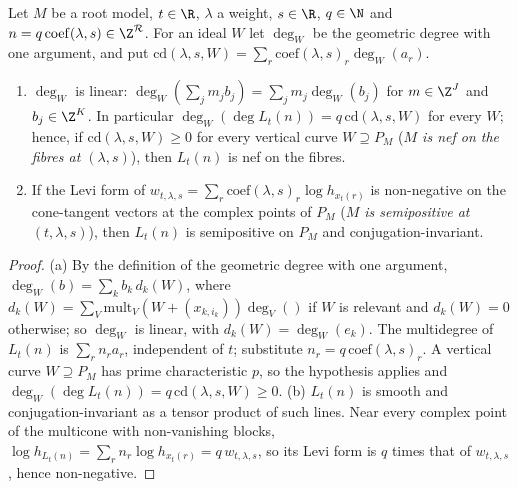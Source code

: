 \begin{lemma}\label{lem:pf:deepstr:nefcomb}
Let $M$ be a root model, $t\in\R$, $\lambda$ a weight, $s\in\R$, $q\in\N$ and $n=q\,\mathrm{coef}(\lambda,s)\in\Z^{\mathcal R}$. For an
ideal $W$ let $\deg_W$ be the geometric degree with one argument, and put
$\mathrm{cd}(\lambda,s,W)=\sum_r\mathrm{coef}(\lambda,s)_r\deg_W(a_r)$.
\begin{enumerate}[label=(\alph*)]
\item $\deg_W$ is linear: $\deg_W(\sum_jm_jb_j)=\sum_jm_j\deg_W(b_j)$ for $m\in\Z^J$ and $b_j\in\Z^K$. In particular
$\deg_W(\deg L_t(n))=q\,\mathrm{cd}(\lambda,s,W)$ for every $W$; hence, if $\mathrm{cd}(\lambda,s,W)\ge0$ for every vertical curve
$W\supseteq P_M$ (\emph{$M$ is nef on the fibres at $(\lambda,s)$}), then $L_t(n)$ is nef on the fibres.
\item If the Levi form of $w_{t,\lambda,s}=\sum_r\mathrm{coef}(\lambda,s)_r\log h_{x_t(r)}$ is non-negative on the cone-tangent
vectors at the complex points of $P_M$ (\emph{$M$ is semipositive at $(t,\lambda,s)$}), then $L_t(n)$ is semipositive
on $P_M$ and conjugation-invariant.
\end{enumerate}
\end{lemma}

\begin{proof}
(a) By the definition of the geometric degree with one argument, $\deg_W(b)=\sum_kb_k\,d_k(W)$, where
$d_k(W)=\sum_V\mathrm{mult}_V(W+(x_{k,i_k}))\deg_V()$ if $W$ is relevant and $d_k(W)=0$ otherwise; so $\deg_W$ is linear,
with $d_k(W)=\deg_W(e_k)$. The multidegree of $L_t(n)$ is $\sum_rn_ra_r$, independent of $t$; substitute
$n_r=q\,\mathrm{coef}(\lambda,s)_r$. A vertical curve $W\supseteq P_M$ has prime characteristic $p$, so the hypothesis applies
and $\deg_W(\deg L_t(n))=q\,\mathrm{cd}(\lambda,s,W)\ge0$. (b) $L_t(n)$ is smooth and conjugation-invariant as a
tensor product of such lines. Near every complex point of the multicone with non-vanishing blocks,
$\log h_{L_t(n)}=\sum_rn_r\log h_{x_t(r)}=q\,w_{t,\lambda,s}$, so its Levi form is $q$ times that of $w_{t,\lambda,s}$, hence
non-negative.
\end{proof}

